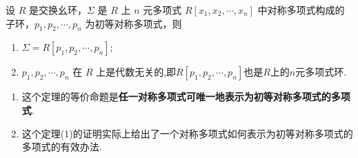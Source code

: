 \documentclass[../../main.tex]{subfiles}%
\begin{document}
\begin{theorem}[对称多项式基本定理]\label{theorem:抽象代数--定理2.3.1--对称多项式基本定理}
设 \( R \) 是交换幺环，\( \Sigma \) 是 \( R \) 上 \( n \) 元多项式 \( R[x_1, x_2, \cdots, x_n] \) 中对称多项式构成的子环，\( p_1, p_2, \cdots, p_n \) 为初等对称多项式，则
\begin{enumerate}[(1)]
\item\label{theorem:抽象代数--定理2.3.1--对称多项式基本定理-1} \( \Sigma = R[p_1, p_2, \cdots, p_n] \);
\item \( p_1, p_2, \cdots, p_n \) 在 \( R \) 上是代数无关的,即$R[p_1, p_2, \cdots, p_n]$也是$R$上的$n$元多项式环.
\end{enumerate}
\end{theorem}
\begin{remark}
\begin{enumerate}
\item 这个定理的等价命题是\textbf{任一对称多项式可唯一地表示为初等对称多项式的多项式}.

\item 这个定理(1)的证明实际上给出了一个对称多项式如何表示为初等对称多项式的多项式的有效办法.
\end{enumerate}
\end{remark}
\end{document}
